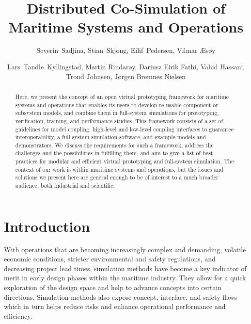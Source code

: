 \documentclass[prb,aps,showpacs,floatfix,twocolumn,10pt]{revtex4-1}
\theoremstyle{plain}
\theoremstyle{remark}
\begin{document}

\title{Distributed Co-Simulation of Maritime Systems and Operations}
\author{Severin~Sadjina, Stian~Skjong, Eilif~Pedersen, Vilmar {\AE}s{\o}y}
\author{Lars~Tandle~Kyllingstad, Martin Rindar{\o}y, Dariusz Eirik Fathi, Vahid Hassani, Trond Johnsen, J{\o}rgen Bremnes Nielsen}

\begin{abstract}
Here, we present the concept of an open virtual prototyping framework for maritime systems and operations that enables its users to develop re-usable component or subsystem models, and combine them in full-system simulations for prototyping, verification, training, and performance studies.
This framework consists of a set of guidelines for model coupling, high-level and low-level coupling interfaces to guarantee interoperability, a full-system simulation software, and example models and demonstrators.
We discuss the requirements for such a framework, address the challenges and the possibilities in fulfilling them, and aim to give a list of best practices for modular and efficient virtual prototyping and full-system simulation.
The context of our work is within maritime systems and operations, but the issues and solutions we present here are general enough to be of interest to a much broader audience, both industrial and scientific.
\end{abstract}

\maketitle





\section{Introduction}
\label{sec:introduction}

With operations that are becoming increasingly complex and demanding, volatile economic conditions, stricter environmental and safety regulations, and decreasing project lead times, simulation methods have become a key indicator of merit in early design phases within the maritime industry.
They allow for a quick exploration of the design space and help to advance concepts into certain directions.\cite{Harries2011}
Simulation methods also expose concept, interface, and safety flaws which in turn helps reduce risks and enhance operational performance and efficiency.
\end{document}
